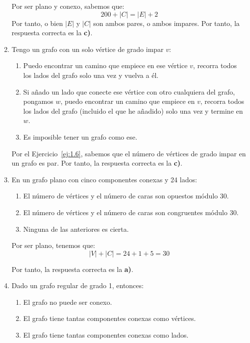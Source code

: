 \begin{ejercicio}
\begin{enumerate}
        Por ser plano y conexo, sabemos que:
        \begin{equation*}
            200+|C|=|E|+2
        \end{equation*}
        Por tanto, o bien $|E|$ y $|C|$ son ambos pares, o ambos impares. Por tanto, la respuesta correcta es la \textbf{c)}.
        \item Tengo un grafo con un solo vértice de grado impar $v$:
        \begin{enumerate}
            \item Puedo encontrar un camino que empiece en ese vértice $v$, recorra todos los lados del grafo solo una vez y vuelva a él.
            \item Si añado un lado que conecte ese vértice con otro cualquiera del grafo, pongamos $w$, puedo encontrar un camino que empiece en $v$, recorra todos los lados del grafo (incluido el que he añadido) solo una vez y termine en $w$.
            \item Es imposible tener un grafo como ese.
        \end{enumerate}

        Por el Ejercicio~\ref{ej:1.6}, sabemos que el número de vértices de grado impar en un grafo es par. Por tanto, la respuesta correcta es la \textbf{c)}.
        \item En un grafo plano con cinco componentes conexas y 24 lados:
        \begin{enumerate}
            \item El número de vértices y el número de caras son opuestos módulo 30.
            \item El número de vértices y el número de caras son congruentes módulo 30.
            \item Ninguna de las anteriores es cierta.
        \end{enumerate}

        Por ser plano, tenemos que:
        \begin{equation*}
            |V|+|C|=24+1+5=30
        \end{equation*}

        Por tanto, la respuesta correcta es la \textbf{a)}.
        \item Dado un grafo regular de grado 1, entonces:
        \begin{enumerate}
            \item El grafo no puede ser conexo.
            \item El grafo tiene tantas componentes conexas como vértices.
            \item El grafo tiene tantas componentes conexas como lados.
        \end{enumerate}


\end{enumerate}
\end{ejercicio}
